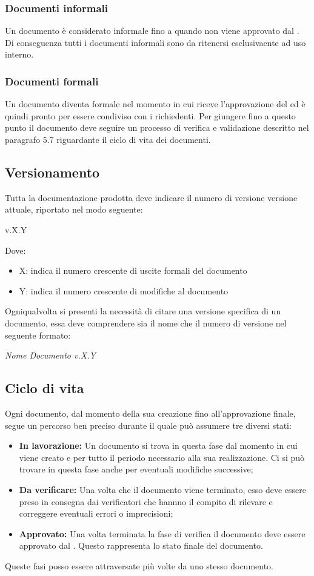 \subsubsection{Documenti informali}
Un documento è considerato informale fino a quando non viene approvato dal \ruoloResponsabile . Di conseguenza tutti i documenti informali sono da ritenersi esclusivaente ad uso interno.

\subsubsection{Documenti formali}
Un documento diventa formale nel momento in cui riceve l'approvazione del \ruoloResponsabile{} ed è quindi pronto per essere condiviso con i richiedenti.
Per giungere fino a questo punto il documento deve seguire un processo di verifica e validazione descritto nel paragrafo 5.7 riguardante il ciclo di vita dei documenti.

\subsection{Versionamento}
Tutta la documentazione prodotta deve indicare il numero di versione versione attuale, riportato nel modo seguente:
\begin{center}
v.X.Y
\end{center}
Dove:
\begin{itemize}
\item X: indica il numero crescente di uscite formali del documento
\item Y: indica il numero crescente di modifiche al documento
\end{itemize}

Ogniqualvolta si presenti la necessità di citare una versione specifica di un documento, essa
deve comprendere sia il nome che il numero di versione nel seguente formato:
\begin{center}
\textit{Nome Documento v.X.Y}
\end{center}

\subsection{Ciclo di vita}
Ogni documento, dal momento della sua creazione fino all'approvazione finale, segue un percorso ben preciso durante il quale può assumere tre diversi stati:

\begin{itemize}
\item \textbf{In lavorazione:} Un documento si trova in questa fase dal momento in cui viene creato e per tutto il periodo necessario alla sua realizzazione. Ci si può trovare in questa fase anche per eventuali modifiche successive;
\item \textbf{Da verificare:} Una volta che il documento viene terminato, esso deve essere preso in consegna dai verificatori che hannno il compito di rilevare e correggere eventuali errori o imprecisioni;
\item \textbf{Approvato:} Una volta terminata la fase di verifica il documento deve essere approvato dal \ruoloResponsabile. Questo rappresenta lo stato finale del documento. 
\end{itemize}

Queste fasi posso essere attraversate più volte da uno stesso documento.

\newpage



